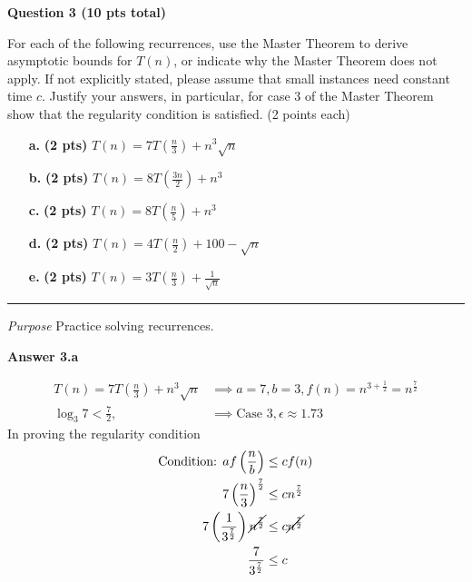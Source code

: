 \documentclass{article}
\begin{document}
\begin{framed}
    \textbf{Question 3 (10 pts total)} 
    
    For each of the following recurrences, use the Master Theorem to derive
    asymptotic bounds for $T(n)$, or indicate why the Master Theorem does not
    apply. If not explicitly stated, please assume that small instances need
    constant time $c$. Justify your answers, in particular, for case 3 of the
    Master Theorem show that the regularity condition is satisfied. (2 points
    each)
    
    \begin{enumerate}
        \item[\textbf{a.}] \textbf{(2 pts)} $T(n) = 7T(\frac{n}{3}) + 
        n^3\sqrt{n}$
        
        \item[\textbf{b.}] \textbf{(2 pts)} $T(n) = 8T(\frac{3n}{2}) + n^3$
        
        \item[\textbf{c.}] \textbf{(2 pts)} $T(n) = 8T(\frac{n}{5}) + n^3$
        
        \item[\textbf{d.}] \textbf{(2 pts)} $T(n) = 4T(\frac{n}{2}) + 100 - 
        \sqrt{n}$
        
        \item[\textbf{e.}] \textbf{(2 pts)} $T(n) = 3T(\frac{n}{3}) + 
        \frac{1}{\sqrt{n}}$
    \end{enumerate}
    
    \rule{\textwidth}{.2pt}
    
    \textit{Purpose} Practice solving recurrences. 
\end{framed}


\textbf{Answer 3.a}

\begin{align}
    T(n) = 7T \left( \frac{n}{3} \right) + n^3\sqrt{n} & \implies a = 7, b = 3,
        f(n) = n^{3 + \frac{1}{2}} = n^{\frac{7}{2}}  \\
    \log_{3}7 < \frac{7}{2}, & \implies \text{Case 3}, \epsilon \approx 1.73
\end{align}
In proving the regularity condition
\begin{align}
    \text{Condition: } af\left( \frac{n}{b} \right) & \le cf(n) \\
    7 \left( \frac{n}{3} \right)^{\frac{7}{2}} & \le cn^{\frac{7}{2}}  \\
    7 \left( \frac{1}{3^{\frac{7}{2}}} \right) \cancel{n^{\frac{7}{2}}} & \le 
        c \cancel{n^{\frac{7}{2}}}  \\
    \frac{7}{3^\frac{7}{2}} & \le c
\end{align}
\end{document}
